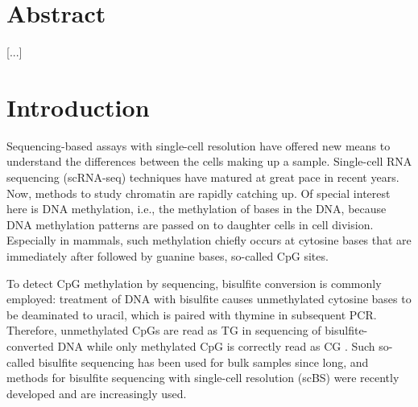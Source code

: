 \documentclass[twocolumn,10pt]{article}
\begin{document}
\setcounter{secnumdepth}{0}


\section{Abstract}

[...]

\section{Introduction}

Sequencing-based assays with single-cell resolution have offered new means to understand the differences between the cells making up a sample. Single-cell RNA sequencing (scRNA-seq) techniques have matured at great pace in recent years. Now, methods to study chromatin are rapidly catching up. Of special interest here is DNA methylation, i.e., the methylation of bases in the DNA, because DNA methylation patterns are passed on to daughter cells in cell division. Especially in mammals, such methylation chiefly occurs at cytosine bases that are immediately after followed by guanine bases, so-called CpG sites. 

To detect CpG methylation by sequencing, bisulfite conversion is commonly employed: treatment of DNA with bisulfite causes unmethylated cytosine bases to be deaminated to uracil, which is paired with thymine in subsequent PCR. Therefore, unmethylated CpGs are read as TG in sequencing of bisulfite-converted DNA while only methylated CpG is correctly read as CG \citep{Frommer_1992}. Such so-called bisulfite sequencing has been used for bulk samples since long, and methods for bisulfite sequencing with single-cell resolution (scBS) were recently developed \citep{Smallwood_2014} and are increasingly used.
\end{document}
